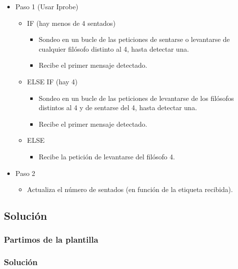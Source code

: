 \documentclass[a4paper,12pt]{article}
\begin{document}
\begin{itemize}
    \item Paso 1 (Usar Iprobe)
    \begin{itemize}
        \item IF (hay menos de 4 sentados)
        \begin{itemize}
            \item Sondeo en un bucle de las peticiones de sentarse o levantarse de cualquier filósofo distinto al 4, hasta detectar una.
            \item Recibe el primer mensaje detectado.
        \end{itemize}
        \item ELSE IF (hay 4)
        \begin{itemize}
            \item Sondeo en un bucle de las peticiones de levantarse de los filósofos distintos al 4 y de sentarse del 4, hasta detectar una.
            \item Recibe el primer mensaje detectado.
        \end{itemize}
        \item ELSE
        \begin{itemize}
            \item Recibe la petición de levantarse del filósofo 4.
        \end{itemize}
    \end{itemize}
    \item Paso 2
    \begin{itemize}
        \item Actualiza el número de sentados (en función de la etiqueta recibida).
    \end{itemize}
\end{itemize}

\subsection{Solución}
\subsubsection{Partimos de la plantilla}

\subsubsection{Solución}

\end{document}
